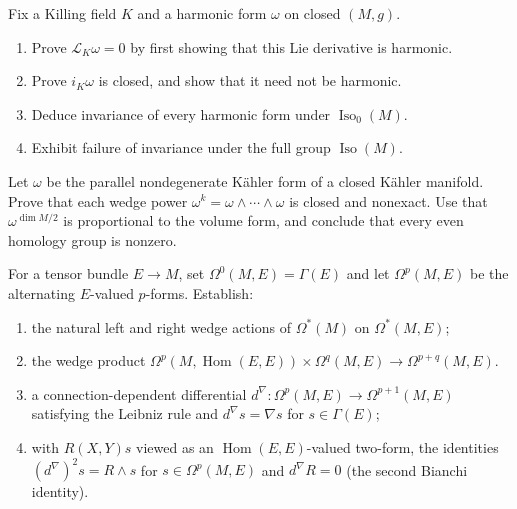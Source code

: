 \begin{remark}
  \label{rem:pet-ch9-exercise-9-6-14}
  Fix a Killing field $K$ and a harmonic form $\omega$ on closed $(M,g)$.
  \begin{enumerate}
    \item[(1)] Prove $\mathcal L_K\omega=0$ by first showing that this Lie
      derivative is harmonic.
    \item[(2)] Prove $i_K\omega$ is closed, and show that it need not be
      harmonic.
    \item[(3)] Deduce invariance of every harmonic form under
      $\operatorname{Iso}_0(M)$.
    \item[(4)] Exhibit failure of invariance under the full group
      $\operatorname{Iso}(M)$.
  \end{enumerate}
\end{remark}

\begin{remark}
  \label{rem:pet-ch9-exercise-9-6-15}
  Let $\omega$ be the parallel nondegenerate K\"ahler form of a closed
  K\"ahler manifold.  Prove that each wedge power
  $\omega^k=\omega\wedge\cdots\wedge\omega$ is closed and nonexact.  Use that
  $\omega^{\dim M/2}$ is proportional to the volume form, and conclude that
  every even homology group is nonzero.
\end{remark}

\begin{remark}
  \label{rem:pet-ch9-exercise-9-6-16}
  For a tensor bundle $E\to M$, set $\Omega^0(M,E)=\Gamma(E)$ and let
  $\Omega^p(M,E)$ be the alternating $E$-valued $p$-forms.  Establish:
  \begin{enumerate}
    \item[(1)] the natural left and right wedge actions of $\Omega^*(M)$ on
      $\Omega^*(M,E)$;
    \item[(2)] the wedge product
      $\Omega^p(M,\operatorname{Hom}(E,E))\times\Omega^q(M,E)\to\Omega^{p+q}(M,E)$.
    \item[(3)] a connection-dependent differential
      $d^\nabla:\Omega^p(M,E)\to\Omega^{p+1}(M,E)$ satisfying the Leibniz
      rule and $d^\nabla s=\nabla s$ for $s\in\Gamma(E)$;
    \item[(4)] with $R(X,Y)s$ viewed as an
      $\operatorname{Hom}(E,E)$-valued two-form, the identities
      $(d^\nabla)^2s=R\wedge s$ for $s\in\Omega^p(M,E)$ and
      $d^\nabla R=0$ (the second Bianchi identity).
  \end{enumerate}
\end{remark}

